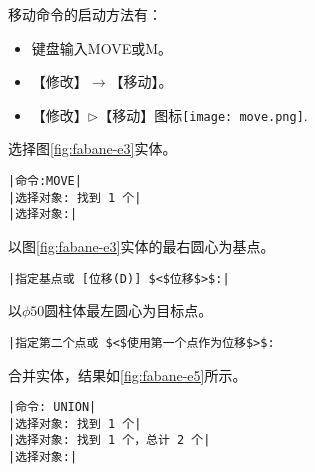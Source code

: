 \begin{procedure}
移动命令的启动方法有：
\begin{itemize}
\item 键盘输入MOVE或M。
\item 【修改】$\rightarrow$【移动】。
\item 【修改】$\triangleright$【移动】图标\texttt{[image: move.png]}.
\end{itemize}
选择图\ref{fig:fabane-e3}实体。
\begin{lstlisting}
|命令:MOVE|
|选择对象: 找到 1 个|
|选择对象:|
\end{lstlisting}
以图\ref{fig:fabane-e3}实体的最右圆心为基点。
\begin{lstlisting}
|指定基点或 [位移(D)] $<$位移$>$:|
\end{lstlisting}
以$\phi 50$圆柱体最左圆心为目标点。
\begin{lstlisting}
|指定第二个点或 $<$使用第一个点作为位移$>$:
\end{lstlisting}
\item 合并实体，结果如\ref{fig:fabane-e5}所示。
\begin{lstlisting}
|命令: UNION|
|选择对象: 找到 1 个|
|选择对象: 找到 1 个，总计 2 个|
|选择对象:|
\end{lstlisting}
\end{procedure}

